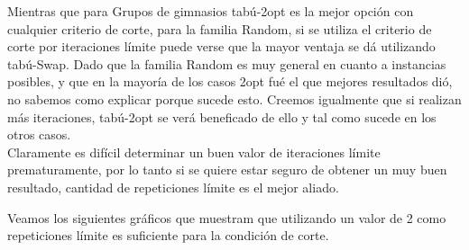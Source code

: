 \begin{figure}[h] 
 \centering
       \label{fig:randomDist1}
    \label{fig:randomMejora1}
\end{figure}

Mientras que para Grupos de gimnasios tabú-2opt es la mejor opción con cualquier criterio de corte, para la familia Random, si se utiliza el criterio de corte por iteraciones límite puede verse que la mayor ventaja se dá utilizando tabú-Swap.
Dado que la familia Random es muy general en cuanto a instancias posibles, y que en la mayoría de los casos 2opt fué el que mejores resultados dió, no sabemos como explicar porque sucede esto. 
Creemos igualmente que si realizan más iteraciones,  tabú-2opt se verá beneficado de ello y tal como sucede en los otros casos.\\

Claramente es difícil determinar un buen valor de iteraciones límite prematuramente, por lo tanto si se quiere estar seguro de obtener un muy buen resultado, cantidad de repeticiones límite es el mejor aliado.

Veamos los siguientes gráficos que muestram que utilizando un valor de 2 como repeticiones límite es suficiente para la condición de corte.

